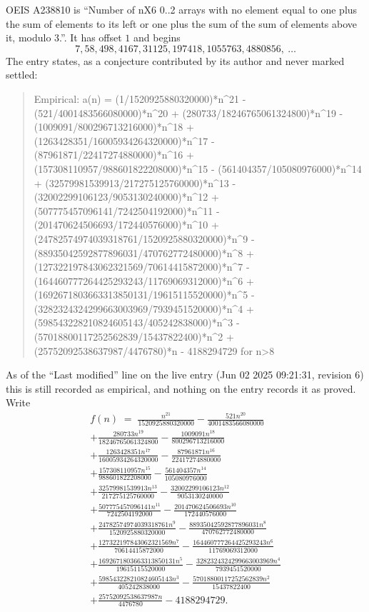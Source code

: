 \documentclass[11pt,a4paper]{article}
\theoremstyle{plain}
\theoremstyle{definition}
\begin{document}
OEIS A238810 is ``Number of nX6 0..2 arrays with no element equal to one plus the sum of elements to its left or one plus the sum of the sum of elements above it, modulo 3.''. It has offset $1$ and begins
\[
7, 58, 498, 4167, 31125, 197418, 1055763, 4880856,\ \dots
\]
The entry states, as a conjecture contributed by its author and never marked settled:
\begin{quote}\raggedright\small
Empirical: a(n) = (1/1520925880320000)*n\^{}21 - (521/4001483566080000)*n\^{}20 + (280733/18246765061324800)*n\^{}19 - (1009091/800296713216000)*n\^{}18 + (1263428351/16005934264320000)*n\^{}17 - (87961871/22417274880000)*n\^{}16 + (157308110957/988601822208000)*n\^{}15 - (561404357/105080976000)*n\^{}14 + (32579981539913/217275125760000)*n\^{}13 - (32002299106123/9053130240000)*n\^{}12 + (507775457096141/7242504192000)*n\^{}11 - (201470624506693/172440576000)*n\^{}10 + (24782574974039318761/1520925880320000)*n\^{}9 - (88935042592877896031/470762772480000)*n\^{}8 + (127322197843062321569/70614415872000)*n\^{}7 - (164460777264425293243/11769069312000)*n\^{}6 + (1692671803663313850131/19615115520000)*n\^{}5 - (3282324324299663003969/7939451520000)*n\^{}4 + (598543228210824605143/405242838000)*n\^{}3 - (57018800117252562839/15437822400)*n\^{}2 + (25752092538637987/4476780)*n - 4188294729 for n>8
\end{quote}
As of the ``Last modified'' line on the live entry (Jun 02 2025 09:21:31, revision 6) this is still
recorded as empirical, and nothing on the entry records it as proved. Write
\begin{multline*}
f(n)\;=\;\frac{n^{21}}{1520925880320000} - \frac{521 n^{20}}{4001483566080000} \\
+ \frac{280733 n^{19}}{18246765061324800} - \frac{1009091 n^{18}}{800296713216000} \\
+ \frac{1263428351 n^{17}}{16005934264320000} - \frac{87961871 n^{16}}{22417274880000} \\
+ \frac{157308110957 n^{15}}{988601822208000} - \frac{561404357 n^{14}}{105080976000} \\
+ \frac{32579981539913 n^{13}}{217275125760000} - \frac{32002299106123 n^{12}}{9053130240000} \\
+ \frac{507775457096141 n^{11}}{7242504192000} - \frac{201470624506693 n^{10}}{172440576000} \\
+ \frac{24782574974039318761 n^{9}}{1520925880320000} - \frac{88935042592877896031 n^{8}}{470762772480000} \\
+ \frac{127322197843062321569 n^{7}}{70614415872000} - \frac{164460777264425293243 n^{6}}{11769069312000} \\
+ \frac{1692671803663313850131 n^{5}}{19615115520000} - \frac{3282324324299663003969 n^{4}}{7939451520000} \\
+ \frac{598543228210824605143 n^{3}}{405242838000} - \frac{57018800117252562839 n^{2}}{15437822400} \\
+ \frac{25752092538637987 n}{4476780} - 4188294729.
\end{multline*}
\end{document}
